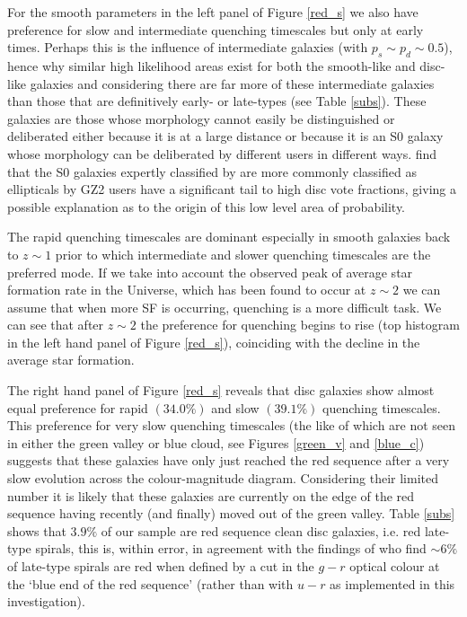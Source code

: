 \documentclass[useAMS,usenatbib]{mn2e}
\def\changed    {\color{titlecol} }
\begin{document}
{\changed For the smooth parameters in the left panel of Figure \ref{red_s} we also have preference for slow and intermediate quenching timescales but only at early times. Perhaps this is the influence of intermediate galaxies (with $p_s \sim p_d \sim 0.5$), hence why similar high likelihood areas exist for both the smooth-like and disc-like galaxies} and considering there are far more of these intermediate galaxies than those that are definitively early- or late-types (see Table \ref{subs}). These galaxies are those whose morphology cannot easily be distinguished or deliberated either because it is at a large distance or because it is an S0 galaxy whose morphology can be deliberated by different users in different ways. \citet{GZ2} find that the S0 galaxies expertly classified by \citet{NA10} are more commonly classified as ellipticals by GZ2 users have a significant tail to high disc vote fractions, giving a possible explanation as to the origin of this low level area of probability.

{ \changed The rapid quenching timescales are dominant especially in smooth galaxies back to $z \sim 1$ prior to which intermediate and slower quenching timescales are the preferred mode. If we take into account the observed peak of average star formation rate in the Universe, which has been found to occur at $z\sim2$ \citep{Hopkins04} we can assume that when more SF is occurring, quenching is a more difficult task. We can see that after $z\sim2$ the preference for quenching begins to rise (top histogram in the left hand panel of Figure \ref{red_s}), coinciding with the decline in the average star formation.}



{\changed The right hand panel of Figure \ref{red_s} reveals that disc galaxies show almost equal preference for rapid $(34.0\%)$ and slow $(39.1\%)$ quenching timescales. This preference for very slow quenching timescales (the like of which are not seen in either the green valley or blue cloud, see Figures \ref{green_v} and \ref{blue_c})} suggests that these  galaxies have only just reached the red sequence after a very slow evolution across the colour-magnitude diagram. Considering their limited number it is likely that these galaxies are currently on the edge of the red sequence having recently (and finally) moved out of the green valley. Table \ref{subs} shows that $3.9\%$ of our sample are red sequence clean disc galaxies, i.e. red late-type spirals, this is, within error, in agreement with the findings of \citet{Masters10} who find $\sim6\%$ of late-type spirals are red when defined by a cut in the $g-r$ optical colour at the `blue end of the red sequence' (rather than with $u-r$ as implemented in this investigation).
\end{document}
